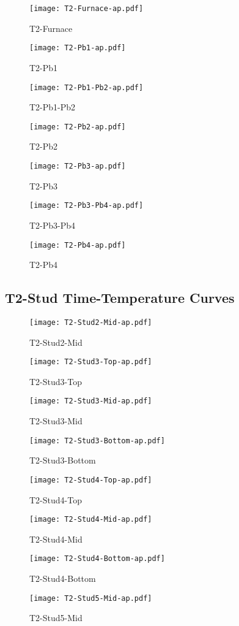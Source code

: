 \begin{figure}[htbp]
\centering
	\texttt{[image: T2-Furnace-ap.pdf]}
	\caption*{T2-Furnace}
\end{figure}
\begin{figure}[htbp]
	\centering
		\texttt{[image: T2-Pb1-ap.pdf]}
		\caption*{T2-Pb1}
\end{figure}
\begin{figure}[htbp]
	\centering
		\texttt{[image: T2-Pb1-Pb2-ap.pdf]}
		\caption*{T2-Pb1-Pb2}
\end{figure}
\begin{figure}[htbp]
	\centering
		\texttt{[image: T2-Pb2-ap.pdf]}
		\caption*{T2-Pb2}
\end{figure}
\begin{figure}[htbp]
	\centering
		\texttt{[image: T2-Pb3-ap.pdf]}
		\caption*{T2-Pb3}
\end{figure}
\begin{figure}[htbp]
	\centering
			\texttt{[image: T2-Pb3-Pb4-ap.pdf]}
			\caption*{T2-Pb3-Pb4}
\end{figure}
\begin{figure}[htbp]
	\centering
			\texttt{[image: T2-Pb4-ap.pdf]}
			\caption*{T2-Pb4}
\end{figure}

\pagebreak

\subsection*{T2-Stud Time-Temperature Curves}

\begin{figure}[htbp]
	\centering
			\texttt{[image: T2-Stud2-Mid-ap.pdf]}
			\caption*{T2-Stud2-Mid}
\end{figure}
\begin{figure}[htbp]
	\centering
			\texttt{[image: T2-Stud3-Top-ap.pdf]}
			\caption*{T2-Stud3-Top}
\end{figure}
\begin{figure}[htbp]
	\centering
			\texttt{[image: T2-Stud3-Mid-ap.pdf]}
			\caption*{T2-Stud3-Mid}
\end{figure}
\begin{figure}[htbp]
	\centering
			\texttt{[image: T2-Stud3-Bottom-ap.pdf]}
			\caption*{T2-Stud3-Bottom}
\end{figure}
\begin{figure}[htbp]
	\centering
			\texttt{[image: T2-Stud4-Top-ap.pdf]}
			\caption*{T2-Stud4-Top}
\end{figure}
\begin{figure}[htbp]
	\centering
			\texttt{[image: T2-Stud4-Mid-ap.pdf]}
			\caption*{T2-Stud4-Mid}
\end{figure}
\begin{figure}[htbp]
	\centering
			\texttt{[image: T2-Stud4-Bottom-ap.pdf]}
			\caption*{T2-Stud4-Bottom}
\end{figure}
\begin{figure}[htbp]
	\centering
			\texttt{[image: T2-Stud5-Mid-ap.pdf]}
			\caption*{T2-Stud5-Mid}
\end{figure}

